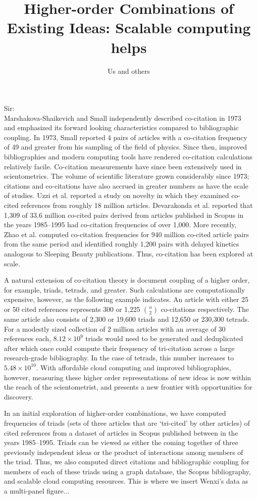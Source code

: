 \documentclass[notitlepage]{report}
\title{Higher-order Combinations of Existing Ideas: Scalable computing helps}
\author{Us and others}
\date{}
\begin{document}
\maketitle
\thispagestyle{empty}
Sir:\\

Marshakova-Shaikevich and Small independently described co-citation in 1973 and emphasized its forward looking characteristics compared to bibliographic coupling. In 1973, Small reported 4 pairs of articles with a co-citation frequency of 49 and greater from his sampling of the field of physics. Since then, improved bibliographies and modern computing tools have rendered co-citation calculations relatively facile. Co-citation measurements have since been extensively used in scientometrics. The volume of scientific literature grown considerably since 1973; citations and co-citations have also accrued in greater numbers as have the scale of studies. Uzzi et al. reported a study on novelty in which they examined co-cited references from roughly 18 million articles. Devarakonda et al. reported that 1,309 of 33.6 million co-cited pairs derived from articles published in Scopus in the years 1985--1995 had co-citation frequencies of over 1,000. More recently, Zhao et al. computed co-citation frequencies for 940 million co-cited article pairs from the same period and identified roughly 1,200 pairs with delayed kinetics analogous to Sleeping Beauty publications. Thus, co-citation has been explored at scale.

A natural extension of co-citation theory is document coupling of a higher order, for example, triads, tetrads, and greater. Such calculations are computationally expensive, however, as the following example indicates. An article with either 25 or 50 cited references represents 300 or 1,225 $n\choose2$ co-citations respectively. The same article also consists of  2,300 or 19,600 triads and  12,650 or  230,300 tetrads. For a modestly sized collection of 2 million articles with an average of 30 references each, $8.12 \times10^9$ triads would need to be generated and deduplicated after which once could compute their frequency of tri-citation across a large research-grade bibliography. In the case of tetrads, this number increases to $5.48 \times 10^{10}$.  With affordable cloud computing and improved bibliographies, however, measuring these higher order representations of new ideas is now within the reach of the scientometrist, and presents a new frontier with opportunities for discovery.

In an initial exploration of higher-order combinations, we have computed frequencies of triads (sets of three articles that are `tri-cited' by other articles) of cited references from a dataset of articles in Scopus published between in the years 1985--1995. Triads can be viewed as either the coming together of three previously independent ideas or the product of interactions among members of the triad. Thus, we also computed direct citations and bibliographic coupling for members of each of these triads using a graph database, the Scopus bibliography, and scalable cloud computing resources. This is where we insert Wenxi's data as a multi-panel figure...
\end{document}
